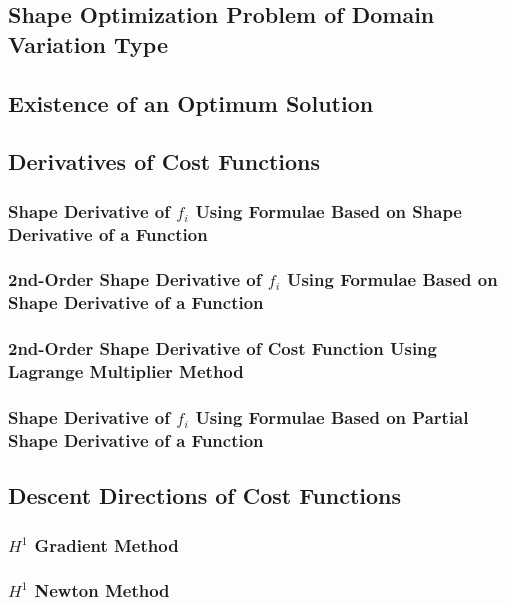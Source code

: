 \documentclass[oneside]{book}
\numberwithin{equation}{section}
\begin{document}
\subsection{Shape Optimization Problem of Domain Variation Type}

\subsection{Existence of an Optimum Solution}

\subsection{Derivatives of Cost Functions}

\subsubsection{Shape Derivative of $f_i$ Using Formulae Based on Shape Derivative of a Function}

\subsubsection{2nd-Order Shape Derivative of $f_i$ Using Formulae Based on Shape Derivative of a Function}

\subsubsection{2nd-Order Shape Derivative of Cost Function Using Lagrange Multiplier Method}

\subsubsection{Shape Derivative of $f_i$ Using Formulae Based on Partial Shape Derivative of a Function}

\subsection{Descent Directions of Cost Functions}

\subsubsection{$H^1$ Gradient Method}

\subsubsection{$H^1$ Newton Method}
\end{document}
